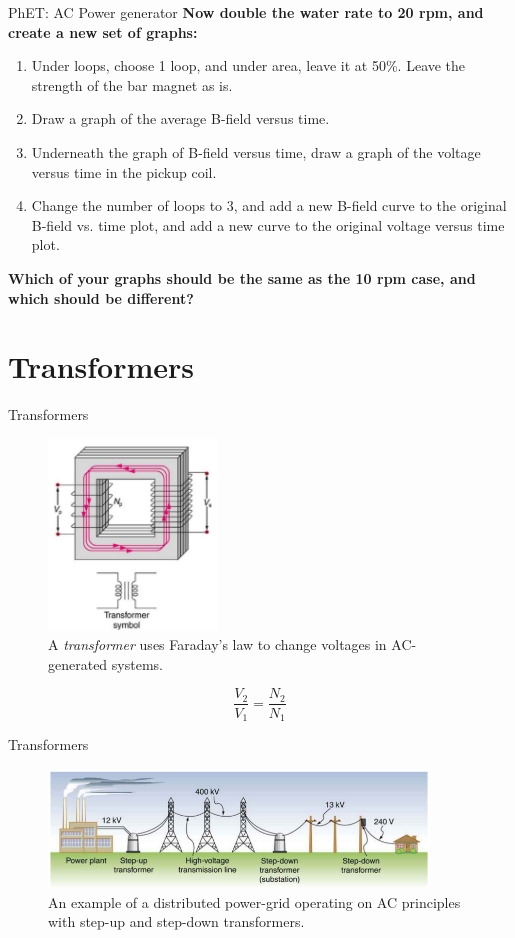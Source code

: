 \documentclass{beamer}
\begin{document}
\begin{frame}{PhET: AC Power generator}
\small
\textbf{Now double the water rate to 20 rpm, and create a new set of graphs:}
\begin{enumerate}
\item Under loops, choose 1 loop, and under area, leave it at 50\%.  Leave the strength of the bar magnet as is.
\item Draw a graph of the average B-field versus time.
\item Underneath the graph of B-field versus time, draw a graph of the voltage versus time in the pickup coil.
\item Change the number of loops to 3, and add a new B-field curve to the original B-field vs. time plot, and add a new curve to the original voltage versus time plot.
\end{enumerate}
\textbf{Which of your graphs should be the same as the 10 rpm case, and which should be different?}
\end{frame}

\section{Transformers}

\begin{frame}{Transformers}
\small
\begin{figure}
\centering
\includegraphics[width=0.4\textwidth]{figures/trans.png}
\caption{\label{fig:trans1} A \textit{transformer} uses Faraday's law to change voltages in AC-generated systems.}
\end{figure}
\begin{equation}
\frac{V_2}{V_1} = \frac{N_2}{N_1}
\end{equation}
\end{frame}

\begin{frame}{Transformers}
\small
\begin{figure}
\centering
\includegraphics[width=0.9\textwidth]{figures/trans2.png}
\caption{\label{fig:trans2} An example of a distributed power-grid operating on AC principles with step-up and step-down transformers.}
\end{figure}
\end{frame}
\end{document}
